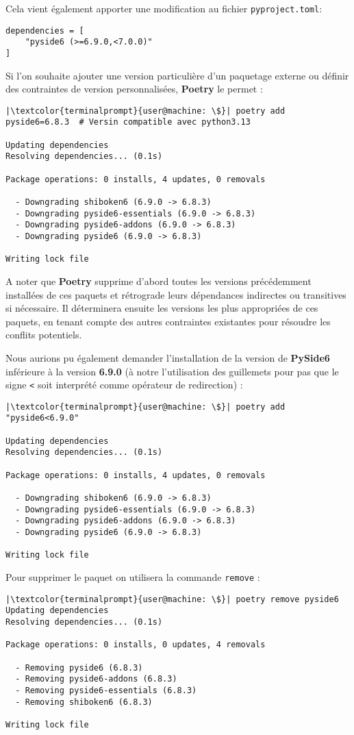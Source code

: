 Cela vient également apporter une modification au fichier \texttt{pyproject.toml}:
\begin{verbatim}
dependencies = [
    "pyside6 (>=6.9.0,<7.0.0)"
]
\end{verbatim}

Si l'on souhaite ajouter une version particulière d'un paquetage externe ou définir des contraintes de version personnalisées, \textbf{Poetry} le permet :
\begin{lstlisting}[style=terminal]
|\textcolor{terminalprompt}{user@machine: \$}| poetry add pyside6=6.8.3  # Versin compatible avec python3.13

Updating dependencies
Resolving dependencies... (0.1s)

Package operations: 0 installs, 4 updates, 0 removals

  - Downgrading shiboken6 (6.9.0 -> 6.8.3)
  - Downgrading pyside6-essentials (6.9.0 -> 6.8.3)
  - Downgrading pyside6-addons (6.9.0 -> 6.8.3)
  - Downgrading pyside6 (6.9.0 -> 6.8.3)

Writing lock file
\end{lstlisting}

A noter que \textbf{Poetry} supprime d'abord toutes les versions précédemment installées de ces paquets et rétrograde leurs dépendances indirectes ou transitives si nécessaire. Il déterminera ensuite les versions les plus appropriées de ces paquets, en tenant compte des autres contraintes existantes pour résoudre les conflits potentiels.

Nous aurions pu également demander l'installation de la version de \textbf{PySide6} inférieure à la version \textbf{6.9.0} (à notre l'utilisation des guillemets pour pas que le signe \og \texttt{<} \fg{} soit interprété comme opérateur de redirection) :
\begin{lstlisting}[style=terminal]
|\textcolor{terminalprompt}{user@machine: \$}| poetry add "pyside6<6.9.0"

Updating dependencies
Resolving dependencies... (0.1s)

Package operations: 0 installs, 4 updates, 0 removals

  - Downgrading shiboken6 (6.9.0 -> 6.8.3)
  - Downgrading pyside6-essentials (6.9.0 -> 6.8.3)
  - Downgrading pyside6-addons (6.9.0 -> 6.8.3)
  - Downgrading pyside6 (6.9.0 -> 6.8.3)

Writing lock file
\end{lstlisting}

Pour supprimer le paquet on utilisera la commande \texttt{remove} :
\begin{lstlisting}[style=terminal]
|\textcolor{terminalprompt}{user@machine: \$}| poetry remove pyside6
Updating dependencies
Resolving dependencies... (0.1s)

Package operations: 0 installs, 0 updates, 4 removals

  - Removing pyside6 (6.8.3)
  - Removing pyside6-addons (6.8.3)
  - Removing pyside6-essentials (6.8.3)
  - Removing shiboken6 (6.8.3)

Writing lock file
\end{lstlisting}

